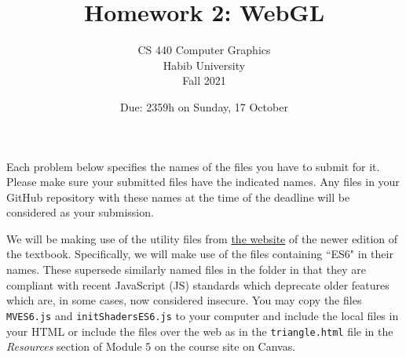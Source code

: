 \documentclass[addpoints]{exam}
\title{Homework 2: WebGL}
\author{CS 440 Computer Graphics\\Habib University\\Fall 2021}
\date{Due: 2359h on Sunday, 17 October}
\begin{document}
\maketitle

Each problem below specifies the names of the files you have to submit for it. Please make sure your submitted files have the indicated names. Any files in your GitHub repository with these names at the time of the deadline will be considered as your submission.

We will be making use of the utility files from \href{https://bit.ly/3Bqt8XG}{the website} of the newer edition of the textbook. Specifically, we will make use of the files containing ``ES6" in their names. These supersede similarly named files in the folder in that they are compliant with recent JavaScript (JS) standards which deprecate older features which are, in some cases, now considered insecure. You may copy the files \texttt{MVES6.js} and \texttt{initShadersES6.js} to your computer and include the local files in your HTML or include the files over the web as in the \texttt{triangle.html} file in the \textit{Resources} section of Module 5 on the course site on Canvas.
\end{document}
